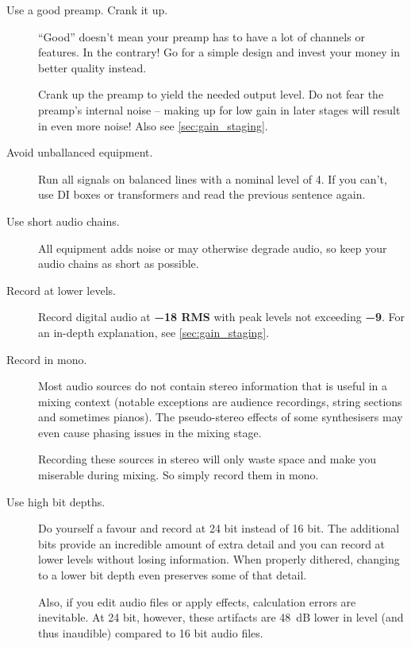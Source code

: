 \begin{description}

\item[Use a good preamp.  Crank it up.]  ``Good'' doesn't mean your
  preamp has to have a lot of channels or features.  In the contrary!
  Go for a simple design and invest your money in better quality
  instead.

  Crank up the preamp to yield the needed output level.  Do not fear
  the preamp's internal noise -- making up for low gain in later
  stages will result in even more noise!  Also see
  \ref{sec:gain_staging}.

\item[Avoid unballanced equipment.]  Run all signals on balanced lines
  with a nominal level of \SI[addsign=all]{+4}{\dBu}.  If you can't,
  use DI boxes or transformers and read the previous sentence again.

\item[Use short audio chains.]  All equipment adds noise or may
  otherwise degrade audio, so keep your audio chains as short as
  possible.

\item[Record at lower levels.]  Record digital audio at
  \textbf{\SI{-18}{\dBFS} RMS} with peak levels not exceeding
  \textbf{\SI{-9}{\dBFS}}.  For an in-depth explanation, see
  \ref{sec:gain_staging}.

\item[Record in mono.]  Most audio sources do not contain stereo
  information that is useful in a mixing context (notable exceptions
  are audience recordings, string sections and sometimes pianos).  The
  pseudo-stereo effects of some synthesisers may even cause phasing
  issues in the mixing stage.

  Recording these sources in stereo will only waste space and make you
  miserable during mixing.  So simply record them in mono.

\item[Use high bit depths.]  Do yourself a favour and record at 24 bit
  instead of 16 bit.  The additional bits provide an incredible amount
  of extra detail and you can record at lower levels without losing
  information.  When properly dithered, changing to a lower bit depth
  even preserves some of that detail.

  Also, if you edit audio files or apply effects, calculation errors
  are inevitable.  At 24 bit, however, these artifacts are
  \SI{48}{\dB} lower in level (and thus inaudible) compared to 16 bit
  audio files.


\end{description}
